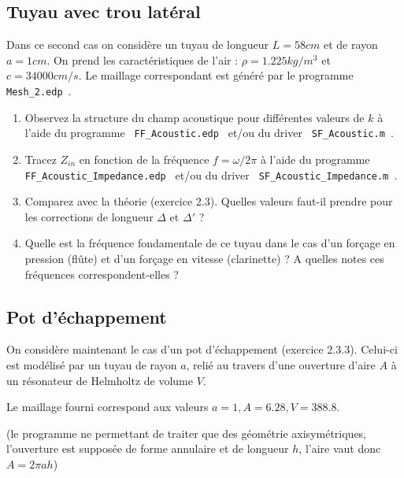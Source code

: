 \documentclass[11pt,a4paper]{article}
\begin{document}
\subsection{Tuyau avec trou latéral}

Dans ce second cas on considère un tuyau de longueur $L = 58cm$ et de rayon $a =1cm$. 
On prend les caractéristiques de l'air : $\rho = 1.225 kg/m^3$ et $c = 34000 cm/s$. 
Le maillage correspondant est généré par le programme \verb| Mesh_2.edp |.

\begin{enumerate}
\item
Observez la structure du champ acoustique pour différentes valeurs de $k$ à l'aide du programme \verb| FF_Acoustic.edp | et/ou du driver \verb| SF_Acoustic.m |.

\item 
Tracez $Z_{in}$ en fonction de la fréquence $f = \omega/2\pi$ à l'aide du programme 
\verb| FF_Acoustic_Impedance.edp | et/ou du driver \verb| SF_Acoustic_Impedance.m |.

\item Comparez avec la théorie (exercice 2.3). Quelles valeurs faut-il prendre pour les corrections de longueur $\Delta$ et $\Delta'$ ?

\item Quelle est la fréquence fondamentale de ce tuyau dans le cas d'un forçage en pression (flûte) et d'un forçage en vitesse (clarinette) ? A quelles notes ces fréquences correspondent-elles ? 

\end{enumerate}

\subsection{Pot d'échappement}

On considère maintenant le cas d'un pot d'échappement (exercice 2.3.3).
Celui-ci est modélisé par un tuyau de rayon $a$, relié au travers d'une
ouverture d'aire $A$ à un résonateur de Helmholtz de volume $V$. 

Le maillage fourni correspond aux valeurs $a=1,A=6.28,V=388.8$.

(le programme ne permettant de traiter que des géométrie axisymétriques, l'ouverture est supposée de forme annulaire et de longueur $h$, l'aire vaut donc $A = 2\pi a h$)
\end{document}
